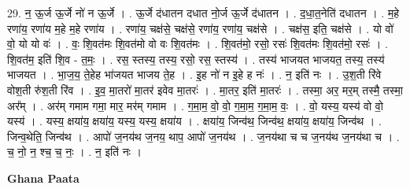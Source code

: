 \documentclass[17pt]{extarticle}
\begin{document}
29. न॒ ऊ॒र्ज ऊ॒र्जे नो॑ न ऊ॒र्जे । . ऊ॒र्जे द॑धातन दधात नो॒र्ज ऊ॒र्जे द॑धातन । . द॒धा॒त॒नेति॑ दधातन । . म॒हे रणा॑य॒ रणा॑य म॒हे म॒हे रणा॑य । . रणा॑य॒ चक्ष॑से॒ चक्ष॑से॒ रणा॑य॒ रणा॑य॒ चक्ष॑से । . चक्ष॑स॒ इति॒ चक्ष॑से । . यो वो॑ वो॒ यो यो वः॑ । . वः॒ शि॒वत॑मः शि॒वत॑मो वो वः शि॒वत॑मः । . शि॒वत॑मो॒ रसो॒ रसः॑ शि॒वत॑मः शि॒वत॑मो॒ रसः॑ । . शि॒वत॑म॒ इति॑ शि॒व - त॒मः॒ । . रस॒ स्तस्य॒ तस्य॒ रसो॒ रस॒ स्तस्य॑ । . तस्य॑ भाजयत भाजयत॒ तस्य॒ तस्य॑ भाजयत । . भा॒ज॒य॒ ते॒हेह भा॑जयत भाजय ते॒ह । . इ॒ह नो॑ न इ॒हे ह नः॑ । . न॒ इति॑ नः । . उ॒श॒ती रि॑वे वोश॒ती रु॑श॒ती रि॑व । . इ॒व॒ मा॒तरो॑ मा॒तर॑ इवेव मा॒तरः॑ । . मा॒तर॒ इति॑ मा॒तरः॑ । . तस्मा॒ अर॒ मर॒म् तस्मै॒ तस्मा॒ अर᳚म् । . अर॑म् गमाम गमा॒ मार॒ मर॑म् गमाम । . ग॒मा॒म॒ वो॒ वो॒ ग॒मा॒म॒ ग॒मा॒म॒ वः॒ । . वो॒ यस्य॒ यस्य॑ वो वो॒ यस्य॑ । . यस्य॒ क्षया॑य॒ क्षया॑य॒ यस्य॒ यस्य॒ क्षया॑य । . क्षया॑य॒ जिन्व॑थ॒ जिन्व॑थ॒ क्षया॑य॒ क्षया॑य॒ जिन्व॑थ । . जिन्व॒थेति॒ जिन्व॑थ । . आपो॑ ज॒नय॑थ ज॒नय॒ थाप॒ आपो॑ ज॒नय॑थ । . ज॒नय॑था च च ज॒नय॑थ ज॒नय॑था च । . च॒ नो॒ न॒ श्च॒ च॒ नः॒ । . न॒ इति॑ नः । \newline

\textbf{Ghana Paata } \newline
\end{document}
